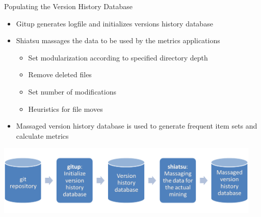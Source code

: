 \begin{frame}{Populating the Version History Database}
  \begin{itemize}
  \item Gitup generates logfile and initializes versions history
    database
  \item Shiatsu massages the data to be used by the metrics
    applications
    \begin{itemize}
    \item Set modularization according to specified directory depth
    \item Remove deleted files
    \item Set number of modifications
    \item Heuristics for file moves
    \end{itemize}
  \item Massaged version history database is used to generate frequent
    item sets and calculate metrics
  \end{itemize}


  \begin{center}
    \includegraphics[width=0.95\textwidth]{figures/initialize-database}
  \end{center}
\end{frame}



